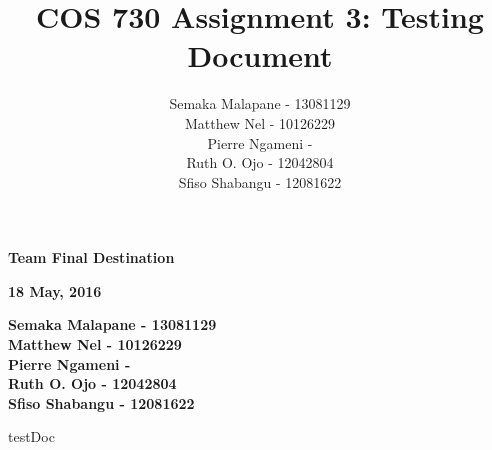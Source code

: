 \documentclass[a4paper]{article}
\title{COS 730 Assignment 3: Testing Document}
\author{Semaka Malapane -  13081129 \\
		Matthew Nel -  10126229\\
		Pierre Ngameni -  \\
		Ruth O. Ojo - 12042804 \\
		Sfiso Shabangu - 12081622 }
\begin{document}
	


\begin{titlepage}
    \begin{center}
        \vspace*{1.5cm}        
        \Huge
        \textbf{Team Final Destination}

        \vspace{1.5cm}        
        \large
        \textbf{18 May, 2016}
        
        \vspace{1.0cm}
        
		\large       
	        \textbf{Semaka Malapane -  13081129}\\
			\textbf{Matthew Nel - 10126229} \\
			\textbf{Pierre Ngameni -  }\\
			\textbf{Ruth O. Ojo - 12042804 }\\
			\textbf{Sfiso Shabangu - 12081622}        
        
        
    \end{center}
\end{titlepage}


\pagebreak
\tableofcontents
\pagebreak

{testDoc}



\end{document}

